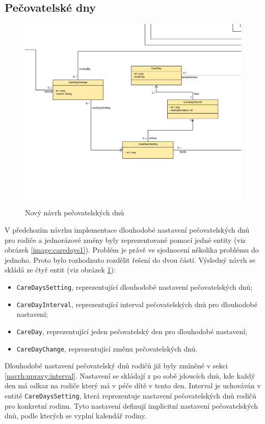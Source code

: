     \subsection{Pečovatelské dny}\label{navrh:upravy:caredays} %
        \begin{figure}\centering
	       \includegraphics[width=1.0\textwidth]{pdfs/CareDays2}
	       \caption[Nový návrh pečovatelských dnů]{Nový návrh pečovatelských dnů}\label{image:caredays2}
        \end{figure}
        V předchozím návrhu implementace dlouhodobé nastavení pečovatelských dnů pro rodiče a jednorázové změny byly reprezentované pomocí jedné entity (viz obrázek \ref{image:caredays1}). Problém je právě ve sjednocení několika problému do jednoho. Proto bylo rozhodnuto rozdělit řešení do dvou částí. Výsledný návrh se skládá ze čtyř entit (viz obrázek \ref{image:caredays2}):
        \begin{itemize}
            \item \texttt{CareDaysSetting}, reprezentující dlouhodobé nastavení pečovatelských dnů;
            \item \texttt{CareDayInterval}, reprezentující interval pečovatelských dnů pro dlouhodobé nastavení;
            \item \texttt{CareDay}, reprezentující jeden pečovatelský den pro dlouhodobé nastavení;
            \item \texttt{CareDayChange}, reprezentující změnu pečovatelských dnů.
        \end{itemize}
        Dlouhodobé nastavení pečovatelský dnů rodičů již byly zmíněné v sekci \ref{navrh:upravy:interval}. Nastavení se skládají z po sobě jdoucích dnů, kde každý den má odkaz na rodiče který má v péče dítě v tento den. Interval je uchováván v entitě \verb|CareDaysSetting|, která reprezentuje nastavení pečovatelských dnů rodičů pro konkretní rodinu. Tyto nastavení definují implicitní nastavení pečovatelských dnů, podle kterých se vyplní kalendář rodiny.
        
